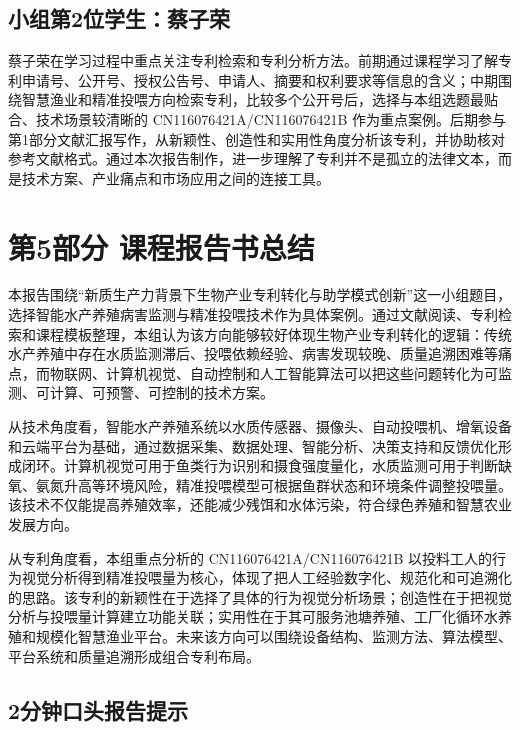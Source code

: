 \documentclass[UTF8,zihao=-4]{ctexart}
\begin{document}
	\subsection*{小组第2位学生：蔡子荣}
	
	蔡子荣在学习过程中重点关注专利检索和专利分析方法。前期通过课程学习了解专利申请号、公开号、授权公告号、申请人、摘要和权利要求等信息的含义；中期围绕智慧渔业和精准投喂方向检索专利，比较多个公开号后，选择与本组选题最贴合、技术场景较清晰的 CN116076421A/CN116076421B 作为重点案例。后期参与第1部分文献汇报写作，从新颖性、创造性和实用性角度分析该专利，并协助核对参考文献格式。通过本次报告制作，进一步理解了专利并不是孤立的法律文本，而是技术方案、产业痛点和市场应用之间的连接工具。
	
	\newpage
	
	\section*{第5部分 课程报告书总结}
	
	本报告围绕“新质生产力背景下生物产业专利转化与助学模式创新”这一小组题目，选择智能水产养殖病害监测与精准投喂技术作为具体案例。通过文献阅读、专利检索和课程模板整理，本组认为该方向能够较好体现生物产业专利转化的逻辑：传统水产养殖中存在水质监测滞后、投喂依赖经验、病害发现较晚、质量追溯困难等痛点，而物联网、计算机视觉、自动控制和人工智能算法可以把这些问题转化为可监测、可计算、可预警、可控制的技术方案。
	
	从技术角度看，智能水产养殖系统以水质传感器、摄像头、自动投喂机、增氧设备和云端平台为基础，通过数据采集、数据处理、智能分析、决策支持和反馈优化形成闭环。计算机视觉可用于鱼类行为识别和摄食强度量化，水质监测可用于判断缺氧、氨氮升高等环境风险，精准投喂模型可根据鱼群状态和环境条件调整投喂量。该技术不仅能提高养殖效率，还能减少残饵和水体污染，符合绿色养殖和智慧农业发展方向。
	
	从专利角度看，本组重点分析的 CN116076421A/CN116076421B 以投料工人的行为视觉分析得到精准投喂量为核心，体现了把人工经验数字化、规范化和可追溯化的思路。该专利的新颖性在于选择了具体的行为视觉分析场景；创造性在于把视觉分析与投喂量计算建立功能关联；实用性在于其可服务池塘养殖、工厂化循环水养殖和规模化智慧渔业平台。未来该方向可以围绕设备结构、监测方法、算法模型、平台系统和质量追溯形成组合专利布局。
	
	\subsection*{2分钟口头报告提示}
	
\end{document}
